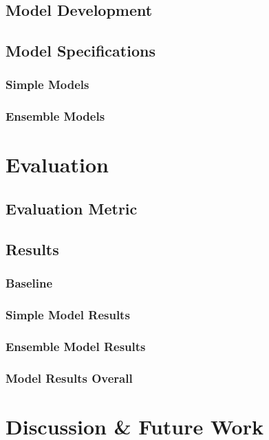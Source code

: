\documentclass[10pt,sigconf,letterpaper,nonacm]{acmart}
\begin{document}
\subsection{Model Development}

\subsection{Model Specifications}

\subsubsection{Simple Models}

\subsubsection{Ensemble Models}


\section{Evaluation}

\subsection{Evaluation Metric}

\subsection{Results}

\subsubsection{Baseline}

\subsubsection{Simple Model Results}

\subsubsection{Ensemble Model Results}

\subsubsection{Model Results Overall}


\section{Discussion \& Future Work}
\end{document}
